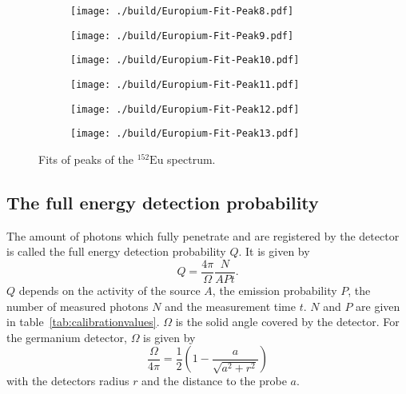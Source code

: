 \begin{figure}[H]
	\begin{adjustbox}{width=1.3\textwidth, center}
		\begin{subfigure}{.5\textwidth}
			\centering
			\texttt{[image: ./build/Europium-Fit-Peak8.pdf]}
		\end{subfigure}%
		\begin{subfigure}{.5\textwidth}
			\centering
			\texttt{[image: ./build/Europium-Fit-Peak9.pdf]}
		\end{subfigure}
	\end{adjustbox}
	\begin{adjustbox}{width=1.3\textwidth, center}
		\begin{subfigure}{.5\textwidth}
			\centering
			\texttt{[image: ./build/Europium-Fit-Peak10.pdf]}
		\end{subfigure}%
		\begin{subfigure}{.5\textwidth}
			\centering
			\texttt{[image: ./build/Europium-Fit-Peak11.pdf]}
		\end{subfigure}
	\end{adjustbox}
	\begin{adjustbox}{width=1.3\textwidth, center}
		\begin{subfigure}{.5\textwidth}
			\centering
			\texttt{[image: ./build/Europium-Fit-Peak12.pdf]}
		\end{subfigure}%
		\begin{subfigure}{.5\textwidth}
			\centering
			\texttt{[image: ./build/Europium-Fit-Peak13.pdf]}
		\end{subfigure}
	\end{adjustbox}
	\caption{Fits of peaks of the $^{152}\text{Eu}$ spectrum.}
\end{figure}
\FloatBarrier


\subsection{The full energy detection probability}
The amount of photons which fully penetrate and are registered by the detector is called the full energy
detection probability $Q$. It is given by
\begin{equation}
	Q = \frac{4 \pi}{\Omega}\frac{N}{APt}.
	\label{eqn:fullenergy}
\end{equation}
$Q$ depends on the activity of the source $A$, the emission probability $P$, the number of measured photons $N$ and
the measurement time $t$. $N$ and $P$ are given in
table~\ref{tab:calibrationvalues}. $\Omega$ is the solid angle covered by the
detector. For the germanium detector, $\Omega$ is given by
\begin{equation}
	\frac{\Omega}{4 \pi} = \frac{1}{2} \left( 1 - \frac{a}{\sqrt{a^{2} + r^{2}}} \right)
	\label{eqn:solidangle}
\end{equation}
with the detectors radius $r$ and the distance to the probe $a$.

